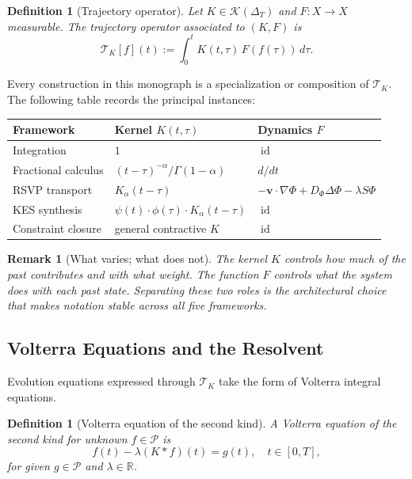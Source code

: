 \documentclass[12pt]{article}
\newtheorem{definition}[theorem]{Definition}
\newtheorem{remark}[theorem]{Remark}
\DeclareMathOperator{\id}{id}
\newcommand{\R}{\mathbb{R}}
\newcommand{\Pcal}{\mathcal{P}}
\newcommand{\Kcal}{\mathcal{K}}
\newcommand{\TK}{\mathcal{T}_K}
\begin{document}
\begin{definition}[Trajectory operator]
\label{def:trajop}
Let $K \in \Kcal(\Delta_T)$ and $F \colon X \to X$ measurable. The
\emph{trajectory operator} associated to $(K, F)$ is
\[
  \TK[f](t) := \int_0^t K(t,\tau)\, F(f(\tau))\, d\tau.
\]
\end{definition}

Every construction in this monograph is a specialization or composition
of $\TK$. The following table records the principal instances:

\medskip
\begin{center}
\renewcommand{\arraystretch}{1.4}
\begin{tabular}{lll}
\toprule
\textbf{Framework} & \textbf{Kernel $K(t,\tau)$} & \textbf{Dynamics $F$} \\
\midrule
Integration & $1$ & $\id$ \\
Fractional calculus & $(t-\tau)^{-\alpha}/\Gamma(1-\alpha)$ & $d/dt$ \\
RSVP transport & $K_\alpha(t-\tau)$ & $-\mathbf{v}\cdot\nabla\Phi + D_\Phi\Delta\Phi - \lambda S\Phi$ \\
KES synthesis & $\psi(t)\cdot\phi(\tau)\cdot K_\alpha(t-\tau)$ & $\id$ \\
Constraint closure & general contractive $K$ & $\id$ \\
\bottomrule
\end{tabular}
\end{center}
\medskip

\begin{remark}[What varies; what does not]
The kernel $K$ controls \emph{how much of the past contributes} and with
what weight. The function $F$ controls \emph{what the system does} with
each past state. Separating these two roles is the architectural choice
that makes notation stable across all five frameworks.
\end{remark}

\subsection{Volterra Equations and the Resolvent}

Evolution equations expressed through $\TK$ take the form of Volterra
integral equations.

\begin{definition}[Volterra equation of the second kind]
A \emph{Volterra equation of the second kind} for unknown $f \in \Pcal$ is
\[
  f(t) - \lambda (K * f)(t) = g(t), \quad t \in [0,T],
\]
for given $g \in \Pcal$ and $\lambda \in \R$.
\end{definition}
\end{document}
